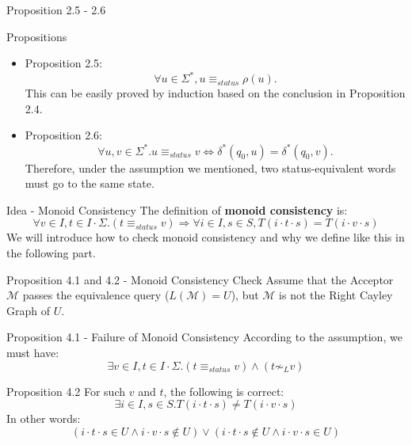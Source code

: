 \documentclass{beamer}
\begin{document}
\begin{frame}{Proposition 2.5 - 2.6}
    \begin{block}{Propositions}
       \begin{itemize}
            \item Proposition 2.5:  
            \[
                \forall u \in \Sigma^*, u \equiv_{status} \rho(u).
            \]
            This can be easily proved by induction based on the conclusion in Proposition 2.4.
            \item Proposition 2.6: 
             \[
                \forall u,v \in \Sigma^*. u \equiv_{status} v \iff \delta^*(q_0,u) = \delta^*(q_0,v).
            \]
            Therefore, under the assumption we mentioned, two status-equivalent words must go to the same state. 
        \end{itemize}
    \end{block}
\end{frame}
\begin{frame}{Idea - Monoid Consistency}
    The definition of \textbf{monoid consistency} is: 
    $$
		\forall v \in I, t\in I\cdot\Sigma. (t \equiv_{status} v) \Rightarrow \forall i\in I, s\in S, T(i\cdot t \cdot s) = T(i \cdot v \cdot s)
    $$
	We will introduce how to check monoid consistency and why we define like this in the following part.		

\end{frame}

\begin{frame}{Proposition 4.1 and 4.2 - Monoid Consistency Check}
    Assume that the Acceptor $\mathcal{M}$ passes the equivalence query ($L(\mathcal{M}) = U$), 
    but $\mathcal{M}$ is not the Right Cayley Graph of $U$. 
    
    \begin{block}{Proposition 4.1 - Failure of Monoid Consistency}
        According to the assumption, we must have:
        \[
        \exists v \in I, t \in I \cdot \Sigma. (t \equiv_{status} v) \wedge (t \not\sim_L v)
        \]
    \end{block}

    \begin{block}{Proposition 4.2}
        For such $v$ and $t$, the following is correct:
        \[
         \exists i \in I, s \in S. T(i \cdot t \cdot s) \neq T(i \cdot v \cdot s)
        \]
        In other words:
        \[
        (i \cdot t \cdot s \in U \wedge i \cdot v \cdot s \notin U) \vee (i \cdot t \cdot s \notin U \wedge i \cdot v \cdot s \in U)
        \]
    \end{block}
\end{frame}
\end{document}
